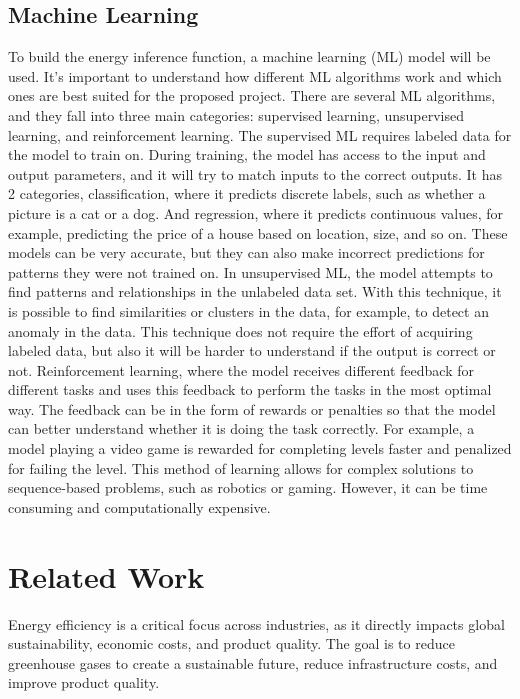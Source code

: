 \documentclass[sigplan]{acmart}
\begin{document}
\subsection{Machine Learning} \label{sec:background_machine_learning}

To build the energy inference function, a machine learning (ML) model will be used. It's important to understand how different ML algorithms work and which ones are best suited for the proposed project. There are several ML algorithms, and they fall into three main categories: supervised learning, unsupervised learning, and reinforcement learning.
The supervised ML requires labeled data for the model to train on. During training, the model has access to the input and output parameters, and it will try to match inputs to the correct outputs. It has 2 categories, classification, where it predicts discrete labels, such as whether a picture is a cat or a dog. And regression, where it predicts continuous values, for example, predicting the price of a house based on location, size, and so on. These models can be very accurate, but they can also make incorrect predictions for patterns they were not trained on.
In unsupervised ML, the model attempts to find patterns and relationships in the unlabeled data set. With this technique, it is possible to find similarities or clusters in the data, for example, to detect an anomaly in the data. This technique does not require the effort of acquiring labeled data, but also it will be harder to understand if the output is correct or not.
Reinforcement learning, where the model receives different feedback for different tasks and uses this feedback to perform the tasks in the most optimal way. The feedback can be in the form of rewards or penalties so that the model can better understand whether it is doing the task correctly. For example, a model playing a video game is rewarded for completing levels faster and penalized for failing the level. This method of learning allows for complex solutions to sequence-based problems, such as robotics or gaming. However, it can be time consuming and computationally expensive.

\section{Related Work} \label{sec:relatedwork}

Energy efficiency is a critical focus across industries, as it directly impacts global sustainability, economic costs, and product quality.  The goal is to reduce greenhouse gases to create a sustainable future, reduce infrastructure costs, and improve product quality\cite{annurev:/content/journals/10.1146/annurev.resource.102308.124234}. 
\end{document}
